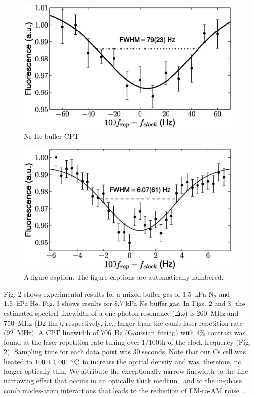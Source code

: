 \documentclass[%
aps,
prl,
showpacs,
twocolumn,
]{revtex4}
\begin{document}
\begin{figure}
\includegraphics[scale=0.5]{Ne_He_buffer.eps}
\caption{\label{fig:cpt1} Ne-He buffer CPT}
\end{figure}

\begin{figure}
\includegraphics[scale=0.5]{8700Ne_buffer.eps}
\caption{\label{fig:cpt2} A figure caption. The figure captions are
automatically numbered.}
\end{figure}


Fig. 2 shows experimental results for a mixed buffer gas of 1.5~kPa N$_2$ and 1.5~kPa He. Fig. 3 shows results for 8.7 kPa Ne buffer gas. In Figs. 2 and 3, the estimated spectral linewidth of a one-photon resonance ($\Delta \omega$) is 260~MHz and 750~MHz (D2 line), 
respectively, i.e., larger than the comb laser repetition rate (92~MHz). A CPT 
linewidth of 706~Hz (Gaussian fitting) with 4\% contrast was found at the laser 
repetition rate tuning over 1/100th of the clock frequency (Fig. 2). Sampling 
time for each data point was 30 seconds. Note that our Cs cell was heated to 
$100\pm0.001~^{\circ}{\rm C}$ to increase the optical density and was, therefore, no longer optically 
thin. We attribute the exceptionally narrow linewidth to the line-narrowing effect 
that occurs in an optically thick medium~\cite{Camparo1999, Knappe2001} and to the in-phase comb modes-atom 
interactions that leads to the reduction of FM-to-AM noise~\cite{Kao2005}. 
\end{document}
